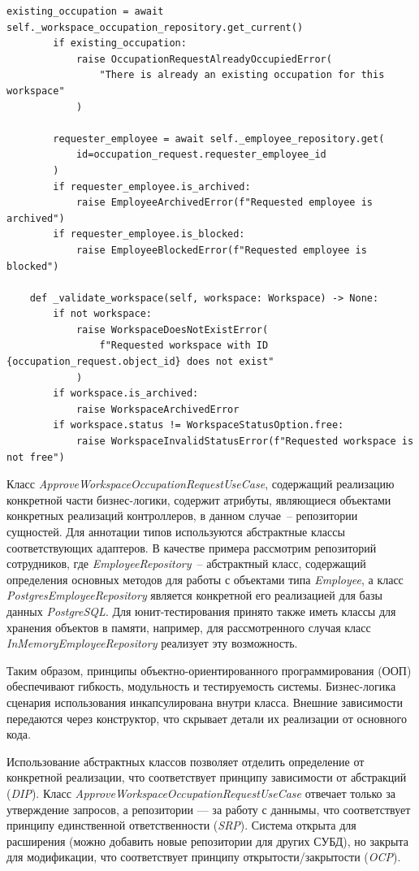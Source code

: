 \begin{lstlisting}[style=pythonstyle]
        existing_occupation = await self._workspace_occupation_repository.get_current()
        if existing_occupation:
            raise OccupationRequestAlreadyOccupiedError(
                "There is already an existing occupation for this workspace"
            )

        requester_employee = await self._employee_repository.get(
            id=occupation_request.requester_employee_id
        )
        if requester_employee.is_archived:
            raise EmployeeArchivedError(f"Requested employee is archived")
        if requester_employee.is_blocked:
            raise EmployeeBlockedError(f"Requested employee is blocked")

    def _validate_workspace(self, workspace: Workspace) -> None:
        if not workspace:
            raise WorkspaceDoesNotExistError(
                f"Requested workspace with ID {occupation_request.object_id} does not exist"
            )
        if workspace.is_archived:
            raise WorkspaceArchivedError
        if workspace.status != WorkspaceStatusOption.free:
            raise WorkspaceInvalidStatusError(f"Requested workspace is not free")
\end{lstlisting}

Класс \textit{ApproveWorkspaceOccupationRequestUseCase}, содержащий реализацию конкретной части бизнес-логики, содержит атрибуты, являющиеся объектами конкретных реализаций контроллеров, в данном случае~-- репозитории сущностей. Для аннотации типов используются абстрактные классы соответствующих адаптеров. В качестве примера рассмотрим репозиторий сотрудников, где \textit{EmployeeRepository}~-- абстрактный класс, содержащий определения основных методов для работы с объектами типа \textit{Employee}, а класс \textit{PostgresEmployeeRepository} является конкретной его реализацией для базы данных \textit{PostgreSQL}. Для юнит-тестирования принято также иметь классы для хранения объектов в памяти, например, для рассмотренного случая класс \textit{InMemoryEmployeeRepository} реализует эту возможность.

Таким образом, принципы объектно-ориентированного программирования (ООП) обеспечивают гибкость, модульность и тестируемость системы. Бизнес-логика сценария использования инкапсулирована внутри класса. Внешние зависимости передаются через конструктор, что скрывает детали их реализации от основного кода.

Использование абстрактных классов позволяет отделить определение от конкретной реализации, что соответствует принципу зависимости от абстракций (\textit{DIP}). Класс \textit{ApproveWorkspaceOccupationRequestUseCase} отвечает только за утверждение запросов, а репозитории — за работу с даннымы, что соответствует принципу единственной ответственности (\textit{SRP}). Система открыта для расширения (можно добавить новые репозитории для других СУБД), но закрыта для модификации, что соответствует принципу открытости/закрытости (\textit{OCP}).

